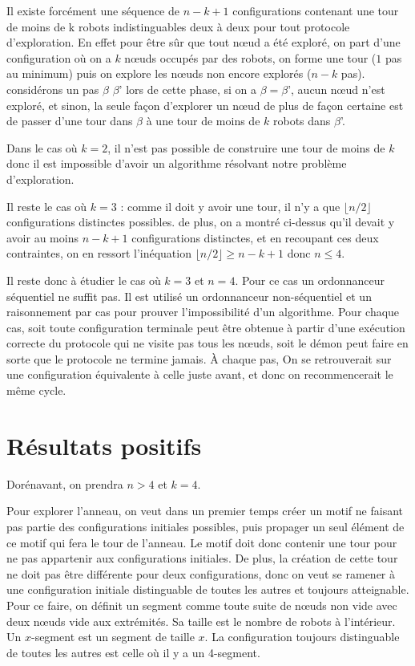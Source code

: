 \documentclass[11pt,letter]{../../pactole-git/tex/llncs} %
\begin{document}
Il existe forcément une séquence de $n-k+1$ configurations contenant une tour de moins de k
robots indistinguables deux à deux pour tout protocole d'exploration. En effet pour être 
sûr que tout nœud a été exploré, on part d'une configuration où on a $k$ nœuds occupés par
des robots, on forme une tour ($1$ pas au minimum) puis on explore les nœuds non encore
explorés ($n-k$ pas). considérons un pas $\beta$ $\beta$' lors de cette phase, si on a 
$\beta = \beta$', aucun nœud n'est exploré, et sinon, la seule façon d'explorer un nœud
de plus de façon certaine est de passer d'une tour dans $\beta$ à 
une tour de moins de $k$ robots dans $\beta$'.



Dans le cas où $k=2$, il n'est pas possible de construire une tour de moins de $k$ donc
il est impossible d'avoir un algorithme résolvant notre problème d'exploration.

Il reste le cas où $k=3$ : comme il doit y avoir une tour, il n'y a que $\lfloor n/2 \rfloor$
configurations distinctes possibles. de plus, on a montré ci-dessus qu'il devait y
avoir au moins $n-k+1$ configurations distinctes, et en recoupant ces deux contraintes, on en
ressort l'inéquation $\lfloor n/2 \rfloor \ge n-k+1$ donc $n \le 4$. 

Il reste donc à étudier le cas où $k=3$ et $n=4$. Pour ce cas un ordonnanceur séquentiel 
ne suffit pas. Il est utilisé un ordonnanceur non-séquentiel et un raisonnement 
par cas pour prouver l'impossibilité d'un algorithme.
Pour chaque cas, soit toute configuration terminale peut être obtenue à partir d'une 
exécution correcte du protocole qui ne visite pas tous les nœuds,
soit le démon peut faire en sorte que le protocole ne termine jamais. À chaque pas,
On se retrouverait sur 
une configuration équivalente à celle juste avant, et donc on recommencerait le même cycle.

\section{Résultats positifs}

Dorénavant, on prendra $n>4$ et $k=4$.

Pour explorer l'anneau, on veut dans un premier temps créer un motif ne faisant pas partie des  
configurations initiales possibles, puis propager un seul élément de ce motif qui fera le tour
de l'anneau. Le motif doit donc contenir une tour pour ne pas appartenir aux configurations 
initiales. De plus, la création de cette tour ne doit pas être différente pour deux
configurations, donc on veut se ramener à une configuration initiale distinguable de toutes
les autres et toujours atteignable. Pour ce faire, on définit un segment comme toute suite de 
nœuds non vide avec deux nœuds vide aux extrémités. Sa taille est le nombre de 
robots à l'intérieur. Un $x$-segment est un segment de taille $x$.
La configuration toujours distinguable de toutes les autres est celle où il y a un 4-segment.
\end{document}
